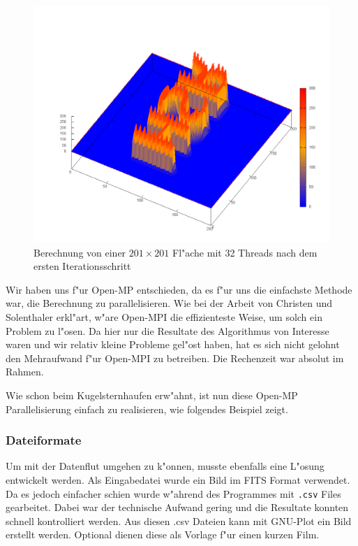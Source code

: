 \begin{refsection}
\begin{figure}
\centering
\includegraphics[width = 15cm]{green/images/step001}
\caption{Berechnung von einer $201 \times 201$ Fl"ache mit 32 Threads nach dem ersten Iterationsschritt}
\label{fig:201_1}
\end{figure}
		
		
Wir haben uns f"ur Open-MP entschieden, da es f"ur uns die einfachste
Methode war, die Berechnung zu parallelisieren. Wie bei der Arbeit
von Christen und Solenthaler erkl"art, w"are Open-MPI die effizienteste
Weise, um solch ein Problem zu l"osen. Da hier nur die Resultate
des Algorithmus von Interesse waren und wir relativ kleine Probleme
gel"ost haben, hat es sich nicht gelohnt den Mehraufwand f"ur
Open-MPI zu betreiben. Die Rechenzeit war absolut im Rahmen.
		
Wie schon beim Kugelsternhaufen erw"ahnt, ist nun diese Open-MP
Parallelisierung einfach zu realisieren, wie folgendes Beispiel
zeigt.
		
\begin{code}
// Parallelisierung einer for-Schleife
	int numthreads = 32;
	#pragma omp parallel for num_threads(numthreads)
		for (i = 0; i < dim; i++)
		{ ...
\end{code}

\subsubsection{Dateiformate}
	
Um mit der Datenflut umgehen zu k"onnen, musste ebenfalls eine
L"osung entwickelt werden. Als Eingabedatei wurde ein Bild im FITS
Format verwendet. Da es jedoch einfacher schien wurde w"ahrend des
Programmes mit \texttt{.csv} Files gearbeitet. Dabei war der
technische Aufwand gering und die Resultate konnten schnell
kontrolliert werden. Aus diesen .csv Dateien kann mit GNU-Plot ein
Bild erstellt werden. Optional dienen diese als Vorlage f"ur einen
kurzen Film.


\end{refsection}
